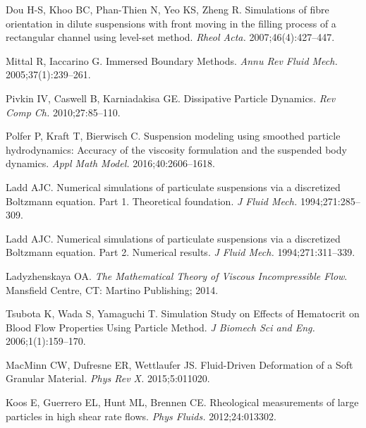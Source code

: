 \documentclass[AMA,STIX1COL]{WileyNJD-v2}
\begin{document}
\begin{thebibliography}{10}
Dou H-S, Khoo BC, Phan-Thien N, Yeo KS, Zheng R. Simulations of fibre
  orientation in dilute suspensions with front moving in the filling process of
  a rectangular channel using level-set method.  {\it Rheol Acta.
  }2007;46(4):427--447.

Mittal R, Iaccarino G. {Immersed Boundary Methods}.  {\it Annu Rev Fluid Mech.
  }2005;37(1):239--261.

Pivkin IV, Caswell B, Karniadakisa GE. {Dissipative Particle Dynamics}.  {\it
  Rev Comp Ch. }2010;27:85--110.

Polfer P, Kraft T, Bierwisch C. Suspension modeling using smoothed particle
  hydrodynamics: Accuracy of the viscosity formulation and the suspended body
  dynamics.  {\it Appl Math Model. }2016;40:2606--1618.

Ladd AJC. {Numerical simulations of particulate suspensions via a discretized
  Boltzmann equation. Part 1. Theoretical foundation}.  {\it J Fluid Mech.
  }1994;271:285--309.

Ladd AJC. {Numerical simulations of particulate suspensions via a discretized
  Boltzmann equation. Part 2. Numerical results}.  {\it J Fluid Mech.
  }1994;271:311--339.

Ladyzhenskaya OA. {\it The Mathematical Theory of Viscous Incompressible Flow}.
\newblock Mansfield Centre, CT: Martino Publishing; 2014.

Tsubota K, Wada S, Yamaguchi T. {Simulation Study on Effects of Hematocrit on
  Blood Flow Properties Using Particle Method}.  {\it J Biomech Sci and Eng.
  }2006;1(1):159--170.

MacMinn CW, Dufresne ER, Wettlaufer JS. Fluid-Driven Deformation of a Soft
  Granular Material.  {\it Phys Rev X. }2015;5:011020.

Koos E, Guerrero EL, Hunt ML, Brennen CE. Rheological measurements of large
  particles in high shear rate flows.  {\it Phys Fluids. }2012;24:013302.

\end{thebibliography}


\end{document}
